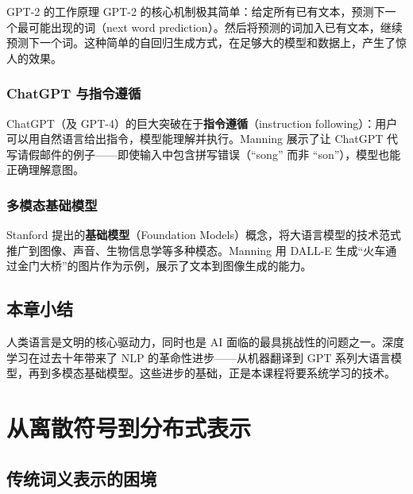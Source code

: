 \documentclass[a4paper]{article}
\begin{document}



\begin{knowledgebox}{GPT-2 的工作原理}
GPT-2 的核心机制极其简单：给定所有已有文本，预测下一个最可能出现的词（next word prediction）。然后将预测的词加入已有文本，继续预测下一个词。这种简单的自回归生成方式，在足够大的模型和数据上，产生了惊人的效果。
\end{knowledgebox}

\subsubsection{ChatGPT 与指令遵循}

ChatGPT（及 GPT-4）的巨大突破在于\textbf{指令遵循}（instruction following）：用户可以用自然语言给出指令，模型能理解并执行。Manning 展示了让 ChatGPT 代写请假邮件的例子——即使输入中包含拼写错误（``song'' 而非 ``son''），模型也能正确理解意图。





\subsubsection{多模态基础模型}

Stanford 提出的\textbf{基础模型}（Foundation Models）概念，将大语言模型的技术范式推广到图像、声音、生物信息学等多种模态。Manning 用 DALL-E 生成``火车通过金门大桥''的图片作为示例，展示了文本到图像生成的能力。





\subsection{本章小结}

人类语言是文明的核心驱动力，同时也是 AI 面临的最具挑战性的问题之一。深度学习在过去十年带来了 NLP 的革命性进步——从机器翻译到 GPT 系列大语言模型，再到多模态基础模型。这些进步的基础，正是本课程将要系统学习的技术。


\section{从离散符号到分布式表示}

\subsection{传统词义表示的困境}
\end{document}
